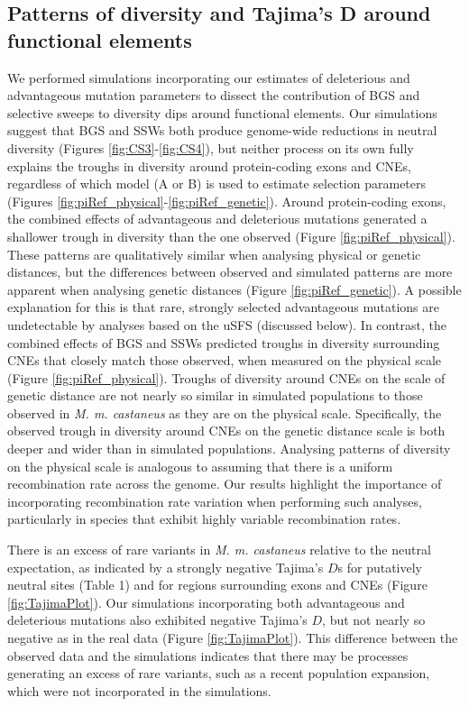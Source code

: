 \subsection{Patterns of diversity and Tajima’s D around functional elements}

	We performed simulations incorporating our estimates of deleterious and advantageous mutation parameters to dissect the contribution of BGS and selective sweeps to diversity dips around functional elements. Our simulations suggest that BGS and SSWs both produce genome-wide reductions in neutral diversity (Figures \ref{fig:CS3}-\ref{fig:CS4}), but neither process on its own fully explains the troughs in diversity around protein-coding exons and CNEs, regardless of which model (A or B) is used to estimate selection parameters (Figures \ref{fig:piRef_physical}-\ref{fig:piRef_genetic}). Around protein-coding exons, the combined effects of advantageous and deleterious mutations generated a shallower trough in diversity than the one observed (Figure \ref{fig:piRef_physical}). These patterns are qualitatively similar when analysing physical or genetic distances, but the differences between observed and simulated patterns are more apparent when analysing genetic distances (Figure \ref{fig:piRef_genetic}). A possible explanation for this is that rare, strongly selected advantageous mutations are undetectable by analyses based on the uSFS (discussed below). In contrast, the combined effects of BGS and SSWs predicted troughs in diversity surrounding CNEs that closely match those observed, when measured on the physical scale (Figure \ref{fig:piRef_physical}). Troughs of diversity around CNEs on the scale of genetic distance are not nearly so similar in simulated populations to those observed in \textit{M. m. castaneus} as they are on the physical scale. Specifically, the observed trough in diversity around CNEs on the genetic distance scale is both deeper and wider than in simulated populations. Analysing patterns of diversity on the physical scale is analogous to assuming that there is a uniform recombination rate across the genome. Our results highlight the importance of incorporating recombination rate variation when performing such analyses, particularly in species that exhibit highly variable recombination rates.

	There is an excess of rare variants in \textit{M. m. castaneus} relative to the neutral expectation, as indicated by a strongly negative Tajima’s $D$s for putatively neutral sites (Table 1) and for regions surrounding exons and CNEs (Figure \ref{fig:TajimaPlot}). Our simulations incorporating both advantageous and deleterious mutations also exhibited negative Tajima’s $D$, but not nearly so negative as in the real data (Figure \ref{fig:TajimaPlot}). This difference between the observed data and the simulations indicates that there may be processes generating an excess of rare variants, such as a recent population expansion, which were not incorporated in the simulations.

